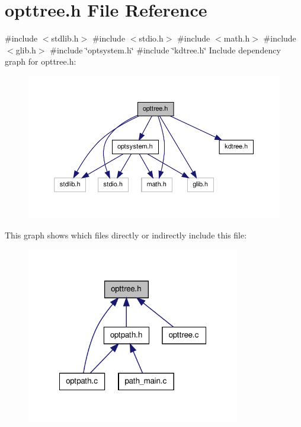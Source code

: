 \hypertarget{a00020}{\section{opttree.\-h \-File \-Reference}
\label{db/db2/a00020}
}
{\ttfamily \#include $<$stdlib.\-h$>$}\*
{\ttfamily \#include $<$stdio.\-h$>$}\*
{\ttfamily \#include $<$math.\-h$>$}\*
{\ttfamily \#include $<$glib.\-h$>$}\*
{\ttfamily \#include \char`\"{}optsystem.\-h\char`\"{}}\*
{\ttfamily \#include \char`\"{}kdtree.\-h\char`\"{}}\*
\-Include dependency graph for opttree.\-h\-:\nopagebreak
\begin{figure}[H]
\begin{center}
\leavevmode
\includegraphics[width=350pt]{dc/d87/a00032}
\end{center}
\end{figure}
\-This graph shows which files directly or indirectly include this file\-:\nopagebreak
\begin{figure}[H]
\begin{center}
\leavevmode
\includegraphics[width=264pt]{d0/dc0/a00033}
\end{center}
\end{figure}
